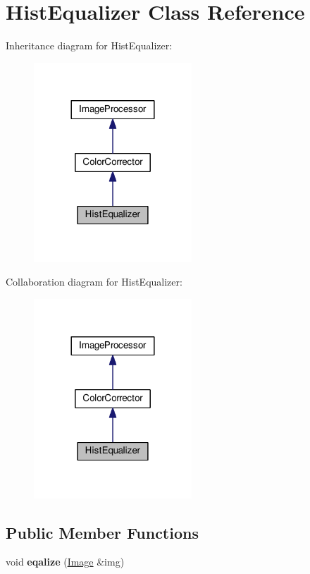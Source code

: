 \hypertarget{classHistEqualizer}{}\section{Hist\+Equalizer Class Reference}
\label{classHistEqualizer}


Inheritance diagram for Hist\+Equalizer\+:\nopagebreak
\begin{figure}[H]
\begin{center}
\leavevmode
\includegraphics[width=168pt]{classHistEqualizer__inherit__graph}
\end{center}
\end{figure}


Collaboration diagram for Hist\+Equalizer\+:\nopagebreak
\begin{figure}[H]
\begin{center}
\leavevmode
\includegraphics[width=168pt]{classHistEqualizer__coll__graph}
\end{center}
\end{figure}
\subsection*{Public Member Functions}
\begin{DoxyCompactItemize}
\item 
void {\bfseries eqalize} (\hyperlink{classImage}{Image} \&img)\hypertarget{classHistEqualizer_ad26e0836fde98f6152bfe060a45fd6d4}{}\label{classHistEqualizer_ad26e0836fde98f6152bfe060a45fd6d4}

\end{DoxyCompactItemize}

